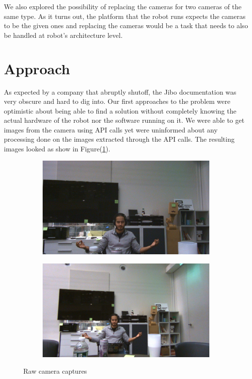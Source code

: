 \documentclass[12pt,letterpaper]{article}
\begin{document}
We also explored the possibility of replacing the cameras for two cameras of the same type. As it turns out, the platform that the robot runs expects the cameras to be the given ones and replacing the cameras would be a task that needs to also be handled at robot's architecture level.

\section{Approach}
As expected by a company that abruptly shutoff, the Jibo documentation was very obscure and hard to dig into. Our first approaches to the problem were optimistic about being able to find a solution without completely knowing the actual hardware of the robot nor the software running on it. We were able to get images from the camera using API calls yet were uninformed about any processing done on the images extracted through the API calls. The resulting images looked as show in Figure(\ref{raw_captures}).

\begin{figure}[ht]
	\centering
	\begin{subfigure}[c]{0.4\linewidth} 
		\includegraphics[width=\linewidth]{./images/pinhole_9.png}
	\end{subfigure}
	\begin{subfigure}[c]{0.4\linewidth}
		\includegraphics[width=\linewidth]{./images/fisheye_9.png}
	\end{subfigure}
	\caption{Raw camera captures}
	\label{raw_captures}
\end{figure}
\end{document}
